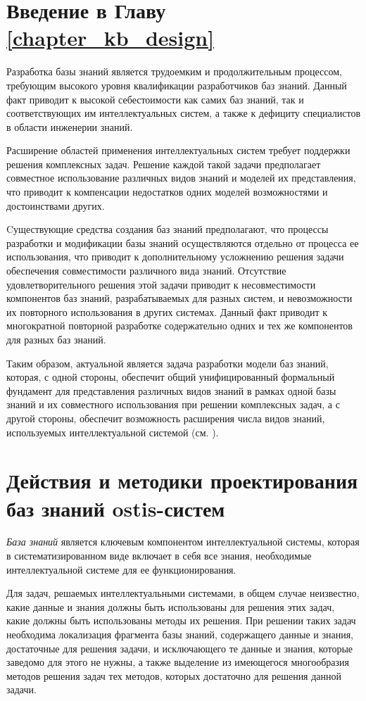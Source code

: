 \section*{Введение в Главу \ref{chapter_kb_design}}

Разработка базы знаний является трудоемким и продолжительным процессом, требующим высокого уровня квалификации разработчиков баз знаний. Данный факт приводит к высокой себестоимости как самих баз знаний, так и соответствующих им интеллектуальных систем, а также к дефициту специалистов в области инженерии знаний.

Расширение областей применения интеллектуальных систем требует поддержки решения комплексных задач.
Решение каждой такой задачи предполагает совместное использование различных видов знаний и моделей их представления, что приводит к компенсации недостатков одних моделей возможностями и достоинствами других.

Cуществующие средства создания баз знаний предполагают, что процессы разработки и модификации базы знаний осуществляются отдельно от процесса ее использования, что приводит к дополнительному усложнению решения задачи обеспечения совместимости различного вида знаний.
Отсутствие удовлетворительного решения этой задачи приводит к несовместимости компонентов баз знаний, разрабатываемых для разных систем, и невозможности их повторного использования в других системах.
Данный факт приводит к многократной повторной разработке содержательно одних и тех же компонентов для разных баз знаний.

Таким образом, актуальной является задача разработки модели баз знаний, которая, с одной стороны, обеспечит общий унифицированный формальный фундамент для представления различных видов знаний в рамках одной базы знаний и их совместного использования при решении комплексных задач, а с другой стороны, обеспечит возможность расширения числа видов знаний, используемых интеллектуальной системой (см. ).


\section{Действия и методики проектирования баз знаний ostis-систем}
\label{sec_kb_design_methods}

\textit{База знаний} является ключевым компонентом интеллектуальной системы, которая в систематизированном виде включает в себя все знания, необходимые интеллектуальной системе для ее функционирования.

Для задач, решаемых интеллектуальными системами, в общем случае неизвестно, какие данные и знания должны быть использованы для решения этих задач, какие должны быть использованы методы их решения.
При решении таких задач необходима локализация фрагмента базы знаний, содержащего данные и знания, достаточные для решения задачи, и исключающего те данные и знания, которые заведомо для этого не нужны, а также выделение из имеющегося многообразия методов решения задач тех методов, которых достаточно для решения данной задачи.

